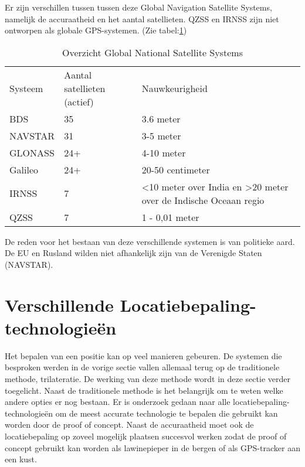 Er zijn verschillen tussen tussen deze Global Navigation Satellite Systems, namelijk de accuraatheid en het aantal satellieten. QZSS en IRNSS zijn niet ontworpen als globale GPS-systemen. (Zie tabel:\ref{tab:GNSS-vergelijking})
\begin{table}[]
	\begin{tabular}{llp{8cm}}
		Systeem & Aantal satellieten (actief) & Nauwkeurigheid                                                                        \\
				BDS     & 35                          & 3.6 meter                                                                      \\
		NAVSTAR & 31                          & 3-5 meter                                                                             \\
		GLONASS & 24+                         & 4-10 meter                                                                            \\
		Galileo & 24+                         & 20-50 centimeter                                                                      \\
		IRNSS   & 7                           & \textless 10 meter over India en \textgreater{}20 meter over de \newline
		Indische Oceaan regio \\
		QZSS    & 7                           & 1 - 0,01 meter                                                                       
	\end{tabular}
\label{tab:GNSS-vergelijking}
\caption{Overzicht Global National Satellite Systems}
\end{table}
\newline
De reden voor het bestaan van deze verschillende systemen is van politieke aard. De EU en Rusland wilden niet afhankelijk zijn van de Verenigde Staten (NAVSTAR).

\section{Verschillende Locatiebepaling-technologieën}
\label{sec:Locatiebepaling-technologieën}
Het bepalen van een positie kan op veel manieren gebeuren. De systemen die besproken werden in de vorige sectie vallen allemaal terug op de traditionele methode, trilateratie. De werking van deze methode wordt in deze sectie verder toegelicht. Naast de traditionele methode is het belangrijk om te weten welke andere opties er nog bestaan. Er is onderzoek gedaan naar alle locatiebepaling-technologieën om de meest accurate technologie te bepalen die gebruikt kan worden door de proof of concept. Naast de accuraatheid moet ook de locatiebepaling op zoveel mogelijk plaatsen succesvol werken zodat de proof of concept gebruikt kan worden als lawinepieper in de bergen of als GPS-tracker aan een kust.


